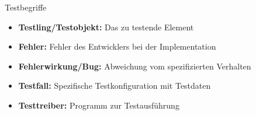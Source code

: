 \begin{definition}{Testbegriffe}
\begin{itemize}
    \item \textbf{Testling/Testobjekt:} Das zu testende Element
    \item \textbf{Fehler:} Fehler des Entwicklers bei der Implementation
    \item \textbf{Fehlerwirkung/Bug:} Abweichung vom spezifizierten Verhalten
    \item \textbf{Testfall:} Spezifische Testkonfiguration mit Testdaten
    \item \textbf{Testtreiber:} Programm zur Testausführung
\end{itemize}
\end{definition}

